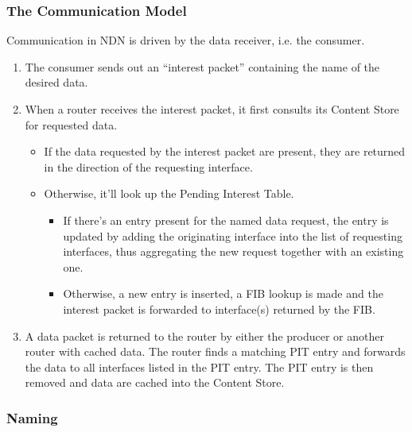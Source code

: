             \subsubsection{The Communication Model}

                Communication in NDN is driven by the data receiver, i.e. the consumer.

                \begin{enumerate}
                    \item The consumer sends out an ``interest packet'' containing the name of the desired data.
                    \item When a router receives the interest packet, it first consults its Content Store for requested data.
                        \begin{itemize}
                            \item If the data requested by the interest packet are present, they are returned in the direction of the requesting interface.
                            \item Otherwise, it'll look up the Pending Interest Table.
                            \begin{itemize}
                                \item If there's an entry present for the named data request, the entry is updated by adding the originating interface into the list of requesting interfaces, thus aggregating the new request together with an existing one.
                                \item Otherwise, a new entry is inserted, a FIB lookup is made and the interest packet is forwarded to interface(s) returned by the FIB.
                            \end{itemize}
                        \end{itemize}
                    \item A data packet is returned to the router by either the producer or another router with cached data. The router finds a matching PIT entry and forwards the data to all interfaces listed in the PIT entry. The PIT entry is then removed and data are cached into the Content Store.
                \end{enumerate}

            \subsubsection{Naming}


